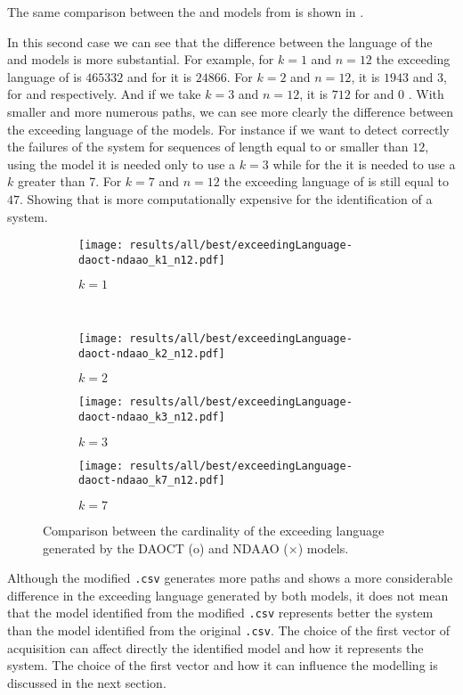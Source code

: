 The same comparison between the \DAOCT{} and \NDAAO{} models from
 is shown in .

In this second case we can see that the difference between the language of the \DAOCT{} and
\NDAAO{} models is more substantial. For example, for $k=1$ and $n=12$ the
exceeding language of \NDAAO{} is $465332$ and for \DAOCT{} it is $24866$. For
$k=2$ and $n=12$, it is $1943$ and $3$, for \NDAAO{} and \DAOCT{} respectively. And
if we take $k=3$ and $n=12$, it is $712$ for \NDAAO{} and $0$ \DAOCT{}. With
smaller and more numerous paths, we can see more clearly the difference between the
exceeding language of the models. For instance if we want to detect correctly
the failures of the system for sequences of length equal to or smaller
than $12$, using the \DAOCT{} model it is needed only to use a $k=3$ while for the
\NDAAO{} it is needed to use a $k$ greater than 7. For $k=7$ and $n=12$ the
exceeding language of \NDAAO{} is still equal to $47$. Showing that \NDAAO{} is more
computationally expensive for the identification of a system.

\begin{figure}[H]
  \begin{subfigure}[H]{0.5\textwidth}
    \centering
    \texttt{[image: results/all/best/exceedingLanguage-daoct-ndaao\_k1\_n12.pdf]}
    \caption{$k=1$}
    \label{fig:daoctNdaaoBestkone}
  \end{subfigure}
  ~
  \begin{subfigure}[h]{0.5\textwidth}
    \centering
    \texttt{[image: results/all/best/exceedingLanguage-daoct-ndaao\_k2\_n12.pdf]}
    \caption{$k=2$}
    \label{fig:daoctNdaaoBestktwo}
  \end{subfigure}
  \begin{subfigure}[h]{0.5\textwidth}
    \centering
    \texttt{[image: results/all/best/exceedingLanguage-daoct-ndaao\_k3\_n12.pdf]}
    \caption{$k=3$}
    \label{fig:daoctNdaaoBestkthree}
  \end{subfigure}
  \begin{subfigure}[h]{0.5\textwidth}
    \centering
    \texttt{[image: results/all/best/exceedingLanguage-daoct-ndaao\_k7\_n12.pdf]}
    \caption{$k=7$}
    \label{fig:daoctNdaaoBestkseven}
  \end{subfigure}
  \caption{Comparison between the cardinality of the exceeding language generated by the DAOCT (o) and
NDAAO ($\times$) models.}
\end{figure}
Although the modified \verb|.csv| generates more paths and shows a more
considerable difference in the exceeding language generated by both models, it
does not mean that the model identified from the modified \verb|.csv| represents better the
system than the model identified from the original \verb|.csv|.
The choice of the first vector of acquisition can affect directly the identified
model and how it represents the system. The choice of the first vector and how
it can influence the modelling is discussed in the
next section.
\newpage

